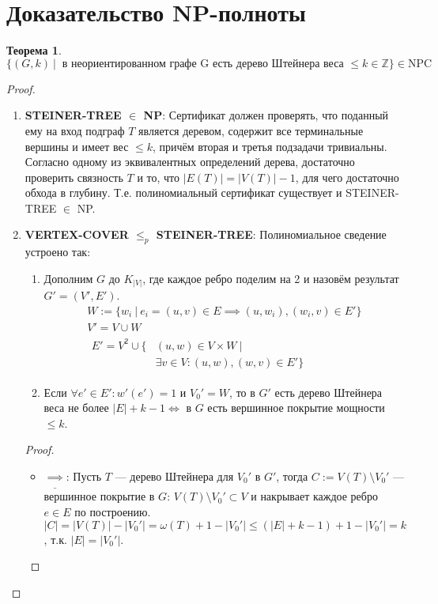 \documentclass[11pt,a4paper]{report}
\def\Integer{\mathbb{Z}}
\def\le{\leqslant}
\theoremstyle{definition}
\theoremstyle{definition}
\newtheorem{theorem}{Теорема}[section]
\theoremstyle{definition}
\begin{document}
	\section{Доказательство NP-полноты}
	\begin{theorem}
		$$ \{ (G, k)\ |\ \text{ в неориентированном графе G есть дерево Штейнера веса } \le k \in \Integer \} \in \mathrm{NPC} $$
	\end{theorem}
	\begin{proof}$  $
		\begin{enumerate}
			\item \textbf{STEINER-TREE $\in$ NP}: 
				Сертификат должен проверять, что поданный ему на вход подграф $T$ является деревом, содержит все терминальные вершины и имеет вес $\le k$, причём вторая и третья подзадачи тривиальны. Согласно одному из эквивалентных определений дерева, достаточно проверить связность $T$ и то, что $|E(T)| = |V(T)| - 1$, для чего достаточно обхода в глубину. Т.е. полиномиальный сертификат существует и STEINER-TREE $\in$ NP.
			\item \textbf{VERTEX-COVER $\le_{p}$ STEINER-TREE}: Полиномиальное сведение устроено так:
			\begin{enumerate}
				\item Дополним $G$ до $K_{|V|}$, где каждое ребро поделим на 2 и назовём результат $G' = (V', E')$.
				\begin{gather*}
					W := \{ w_i\ |\ e_i = (u, v) \in E \implies (u, w_i), (w_i, v) \in E' \}\\
					V' = V \cup W\\
					\begin{aligned}
						E' = V^2 \cup \{& (u, w) \in V \times W\ |\\
						&\exists v \in V: (u, w), (w, v) \in E' \}
					\end{aligned}
				\end{gather*} 
				\item Если $\forall e' \in E': w'(e') = 1$ и $V_0' = W$, то в $G'$ есть дерево Штейнера веса не более $|E| + k - 1 \iff $ в $G$ есть вершинное покрытие мощности $\le k$.
			\end{enumerate}
			\begin{proof}$  $
				\begin{itemize}
					\item $ \underline{\implies} $: Пусть $T$ — дерево Штейнера для $V_0'$ в $G'$, тогда $C := V(T) \setminus V_0'$ — вершинное покрытие в $G$: $ V(T) \setminus V_0' \subset V$ и накрывает каждое ребро $e \in E$ по построению. $ |C| = |V(T)| - |V_0'| = \omega(T) + 1 - |V_0'| \le (|E| + k - 1) + 1 - |V_0'| = k$, т.к. $|E| = |V_0'|$. 

\end{itemize}
\end{proof}
\end{enumerate}
\end{proof}
\end{document}

